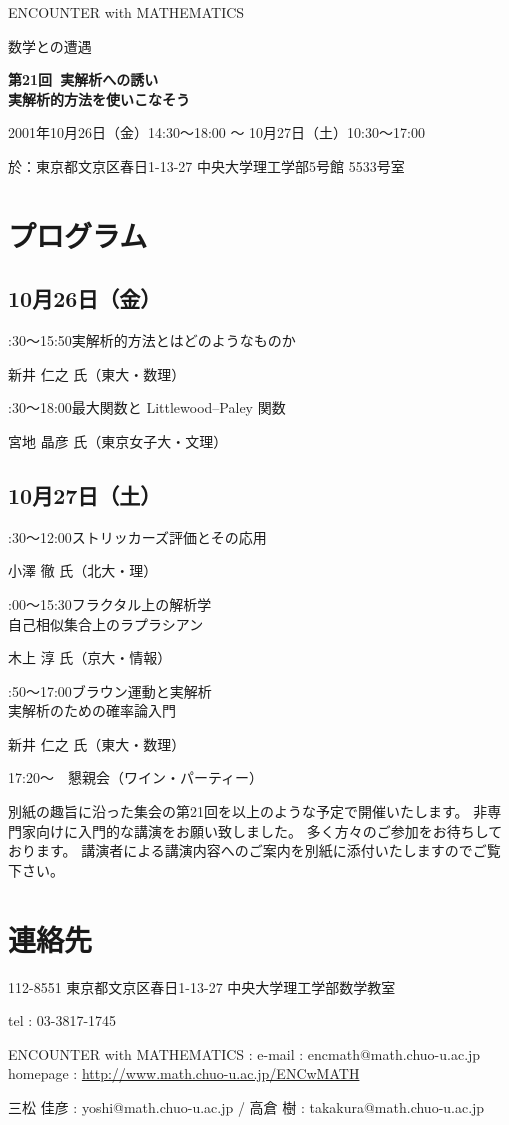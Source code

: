 \documentclass[uplatex,dvipdfmx]{jlreq}
\newcommand{\talk}[3]{%
\noindent
#1\quad #2\par
\hspace*{2em}#3\par\smallskip
}
\newcommand{\EwMnumber}{第21回}
\newcommand{\EwMtitle}{実解析への誘い\\[2mm]\large 実解析的方法を使いこなそう}
\newcommand{\EwMdate}{2001年10月26日（金）14:30～18:00 ～ 10月27日（土）10:30～17:00}
\newcommand{\EwMplace}{東京都文京区春日1-13-27 中央大学理工学部5号館 5533号室}
\newcommand{\EwMtitleblock}{

\vspace*{-5mm}

\begin{center}

{\Large ENCOUNTER with MATHEMATICS}

\vspace{2mm}

{\large 数学との遭遇}

\vspace{4mm}

{\Large \bfseries \EwMnumber\ \EwMtitle}

\vspace{4mm}

\EwMdate

\vspace{2mm}

於：\EwMplace

\end{center}

\vspace{2mm}

}
\begin{document}
\EwMtitleblock


\section*{プログラム}

\subsection*{10月26日（金）}

\talk
{14:30～15:50}
{実解析的方法とはどのようなものか}
{新井 仁之 氏（東大・数理）}

\talk
{16:30～18:00}
{最大関数と Littlewood–Paley 関数}
{宮地 晶彦 氏（東京女子大・文理）}

\subsection*{10月27日（土）}

\talk
{10:30～12:00}
{ストリッカーズ評価とその応用}
{小澤 徹 氏（北大・理）}

\talk
{14:00～15:30}
{フラクタル上の解析学\\[1mm]自己相似集合上のラプラシアン}
{木上 淳 氏（京大・情報）}

\talk
{15:50～17:00}
{ブラウン運動と実解析\\[1mm]実解析のための確率論入門}
{新井 仁之 氏（東大・数理）}

\bigskip

17:20～　懇親会（ワイン・パーティー）


\bigskip

別紙の趣旨に沿った集会の第21回を以上のような予定で開催いたします。  
非専門家向けに入門的な講演をお願い致しました。  
多く方々のご参加をお待ちしております。  
講演者による講演内容へのご案内を別紙に添付いたしますのでご覧下さい。


\section*{連絡先}

112-8551 東京都文京区春日1-13-27 中央大学理工学部数学教室 

tel : 03-3817-1745  

ENCOUNTER with MATHEMATICS : e-mail : encmath@math.chuo-u.ac.jp  
homepage : \url{http://www.math.chuo-u.ac.jp/ENCwMATH}  

三松 佳彦 : yoshi@math.chuo-u.ac.jp / 高倉 樹 : takakura@math.chuo-u.ac.jp
\end{document}

